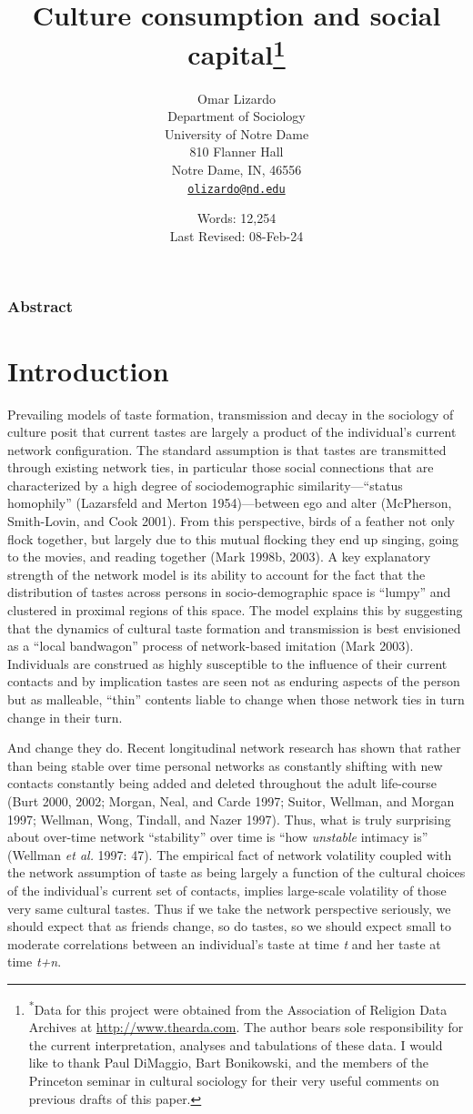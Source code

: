 \documentclass[
]{article}
\title{Culture consumption and social capital\footnote{\textsuperscript{*}Data for this project were obtained from the Association of Religion Data Archives at \url{http://www.thearda.com}. The author bears sole responsibility for the current interpretation, analyses and tabulations of these data. I would like to thank Paul DiMaggio, Bart Bonikowski, and the members of the Princeton seminar in cultural sociology for their very useful comments on previous drafts of this paper.}}
\author{Omar Lizardo \\ Department of Sociology \\ University of Notre Dame \\ 810 Flanner Hall \\ Notre Dame, IN, 46556 \\ \href{mailto:olizardo@nd.edu}{\nolinkurl{olizardo@nd.edu}}}
\date{Words: 12,254 \\ Last Revised: 08-Feb-24}
\begin{document}
\maketitle



\subsubsection{Abstract}\label{abstract}

\section{Introduction}\label{introduction}

Prevailing models of taste formation, transmission and decay in the sociology of culture posit that current tastes are largely a product of the individual's current network configuration. The standard assumption is that tastes are transmitted through existing network ties, in particular those social connections that are characterized by a high degree of sociodemographic similarity---``status homophily'' (Lazarsfeld and Merton 1954)---between ego and alter (McPherson, Smith-Lovin, and Cook 2001). From this perspective, birds of a feather not only flock together, but largely due to this mutual flocking they end up singing, going to the movies, and reading together (Mark 1998b, 2003). A key explanatory strength of the network model is its ability to account for the fact that the distribution of tastes across persons in socio-demographic space is ``lumpy'' and clustered in proximal regions of this space. The model explains this by suggesting that the dynamics of cultural taste formation and transmission is best envisioned as a ``local bandwagon'' process of network-based imitation (Mark 2003). Individuals are construed as highly susceptible to the influence of their current contacts and by implication tastes are seen not as enduring aspects of the person but as malleable, ``thin'' contents liable to change when those network ties in turn change in their turn.

And change they do. Recent longitudinal network research has shown that rather than being stable over time personal networks as constantly shifting with new contacts constantly being added and deleted throughout the adult life-course (Burt 2000, 2002; Morgan, Neal, and Carde 1997; Suitor, Wellman, and Morgan 1997; Wellman, Wong, Tindall, and Nazer 1997). Thus, what is truly surprising about over-time network ``stability'' over time is ``how \emph{unstable} intimacy is'' (Wellman \emph{et al.} 1997: 47). The empirical fact of network volatility coupled with the network assumption of taste as being largely a function of the cultural choices of the individual's current set of contacts, implies large-scale volatility of those very same cultural tastes. Thus if we take the network perspective seriously, we should expect that as friends change, so do tastes, so we should expect small to moderate correlations between an individual's taste at time \emph{t} and her taste at time \emph{t+n}.
\end{document}
